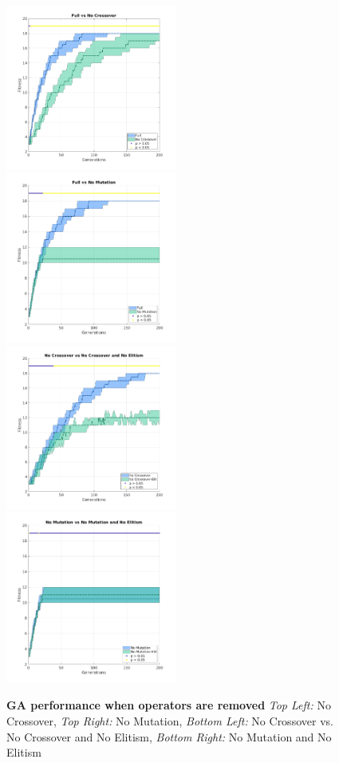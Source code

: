 \documentclass{article}
\begin{document}
		\begin{figure}[h!]
		\includegraphics[width=0.5\textwidth]{img/Full_vsNoCross.png}
		\includegraphics[width=0.5\textwidth]{img/Full_vsNoMut.png}
		\includegraphics[width=0.5\textwidth]{img/NoCross_vsNoCrossNoElite.png}
		\includegraphics[width=0.5\textwidth]{img/NoMut_vsNoMutNoElite.png}
		\caption
		{
		\textbf{GA performance when operators are removed}\newline
		\textit{Top Left:} No Crossover,
		\textit{Top Right:} No Mutation, 
		\textit{Bottom Left:} No Crossover vs. No Crossover and No Elitism, 
		\textit{Bottom Right:} No Mutation and No Elitism
		}
		\end{figure}
\newpage
\end{document}
